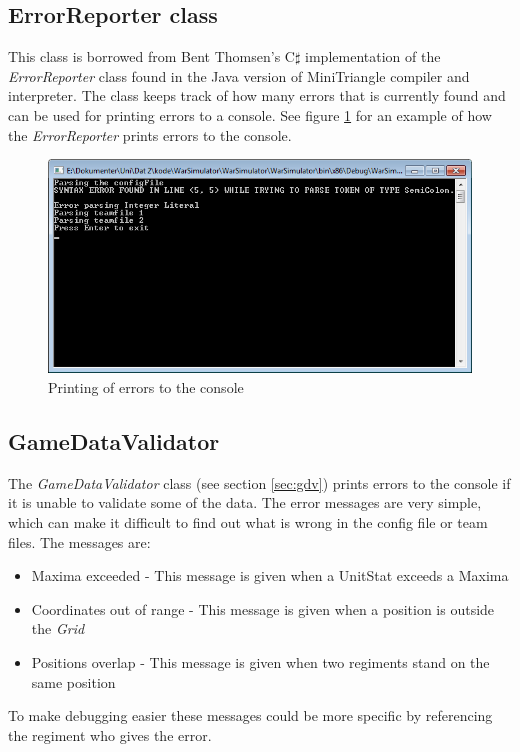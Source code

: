 	\subsection{ErrorReporter class}
		This class is borrowed from Bent Thomsen's \cite{triangle} C$\sharp$ implementation of the {\it ErrorReporter} class found in the 
		Java version of MiniTriangle compiler and interpreter. The class keeps track of how many errors that is currently found and can be used for 
		printing errors to a console. See figure \ref{fig:prterr} for an example of how the {\it ErrorReporter} prints errors to the console.
		\begin{figure}[H]
			\includegraphics[scale=0.8]{rapport/7/figures/errorreporterprint}
			\caption{Printing of errors to the console}
			\label{fig:prterr}
		\end{figure}
	
	\subsection{GameDataValidator}
		The {\it GameDataValidator} class (see section \ref{sec:gdv}) prints errors to the console if it is unable to validate some of the data. 
		The error messages are very simple, which can make it difficult to find out what is wrong in the config file or team files. 
		The messages are:
		\begin{itemize}
			\item Maxima exceeded - This message is given when a UnitStat exceeds a Maxima
			\item Coordinates out of range - This message is given when a position is outside the {\it Grid}
			\item Positions overlap - This message is given when two regiments stand on the same position
		\end{itemize}
		To make debugging easier these messages could be more specific by referencing the regiment who gives the error.
		
	
		
		